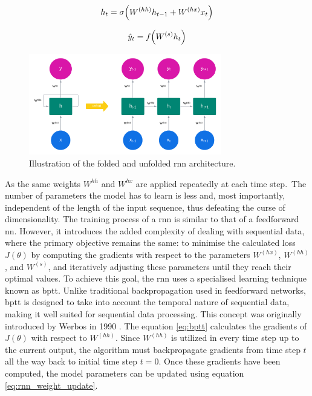 \begin{equation}
    \centering
    h_t = \sigma \Big( W^{(hh)}h_{t-1} + W^{(hx)}x_t \Big)
    \label{eq:update_hidden_state}
\end{equation}

\begin{equation}
    \centering
    \hat{y}_t = f\Big( W^{(s)}h_{t} \Big)
    \label{eq:calculating_the_output}
\end{equation}

\begin{figure}[ht]
    \centering
    \includegraphics[width=0.75\textwidth]{./assets/img/architecture_rnn.png}
    \caption{Illustration of the folded and unfolded \gls{rnn} architecture.}
    \label{fig:RNN_Architecture}
\end{figure}

\noindent
As the same weights $W^{hh}$ and $W^{hx}$ are applied repeatedly at each time step.\
The number of parameters the model has to learn is less and, most importantly, independent of the length of the input sequence, thus defeating the curse of dimensionality.
\newline
\newline
The training process of a \gls{rnn} is similar to that of a feedforward \gls{nn}. However, it introduces the added complexity of dealing with sequential data, where the primary objective remains the same: to minimise the calculated loss $J(\theta)$ by computing the gradients with respect to the parameters $W^{(hx)}$, $W^{(hh)}$, and $W^{(s)}$, and iteratively adjusting these parameters until they reach their optimal values.
\newline
\newline
To achieve this goal, the \gls{rnn} uses a specialised learning technique known as \gls{bptt}. Unlike traditional backpropagation used in feedforward networks, \gls{bptt} is designed to take into account the temporal nature of sequential data, making it well suited for sequential data processing. This concept was originally introduced by Werbos in 1990 \citep{werbos1990backpropagation}.
\newline
\newline
The equation \ref{eq:bptt} calculates the gradients of $J(\theta)$ with respect to $W^{(hh)}$. Since $W^{(hh)}$ is utilized in every time step up to the current output, the algorithm must backpropagate gradients from time step $t$ all the way back to initial time step $t = 0$. Once these gradients have been computed, the model parameters can be updated using equation \ref{eq:rnn_weight_update}.

